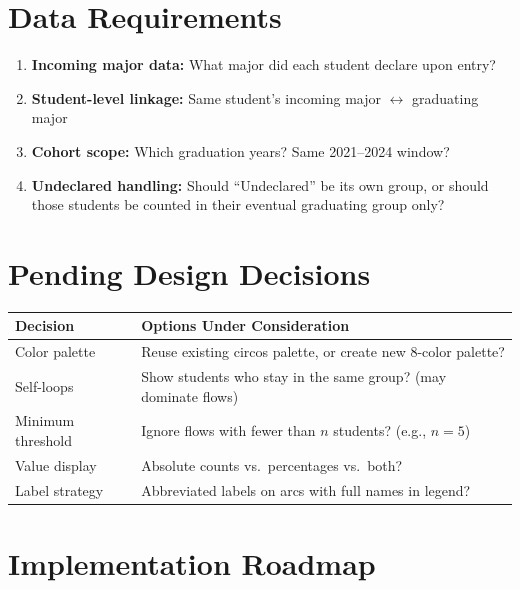 \documentclass[
  11pt,
  letterpaper,
]{report}
\begin{document}
\section{Data Requirements}\label{data-requirements}

\begin{enumerate}
\item \textbf{Incoming major data:} What major did each student declare upon entry?
\item \textbf{Student-level linkage:} Same student's incoming major $\leftrightarrow$ graduating major
\item \textbf{Cohort scope:} Which graduation years? Same 2021--2024 window?
\item \textbf{Undeclared handling:} Should ``Undeclared'' be its own group, or should those students be counted in their eventual graduating group only?
\end{enumerate}

\section{Pending Design Decisions}\label{pending-design-decisions}

\begin{longtable}[]{@{}
  >{\raggedright\arraybackslash}p{}
  >{\raggedright\arraybackslash}p{}@{}}
\toprule\noalign{}
\begin{minipage}[b]{\linewidth}\raggedright
Decision
\end{minipage} & \begin{minipage}[b]{\linewidth}\raggedright
Options Under Consideration
\end{minipage} \\
\midrule\noalign{}
\endhead
\bottomrule\noalign{}
\endlastfoot
Color palette & Reuse existing circos palette, or create new 8-color
palette? \\
Self-loops & Show students who stay in the same group? (may dominate
flows) \\
Minimum threshold & Ignore flows with fewer than \(n\) students? (e.g.,
\(n = 5\)) \\
Value display & Absolute counts vs.~percentages vs.~both? \\
Label strategy & Abbreviated labels on arcs with full names in
legend? \\
\end{longtable}

\section{Implementation Roadmap}\label{implementation-roadmap}
\end{document}
